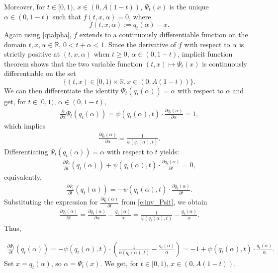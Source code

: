 \documentclass[11pt]{amsart}
\begin{document}
Moreover, for $t \in [0,1)$, $x \in (0, A(1-t))$, $\Psi_t (x)$ is the unique $\alpha \in (0, 1-t)$ such that $f(t,x, \alpha)= 0$, 
where 
$$f(t,x, \alpha) := q_{t}(\alpha) - x.$$
Again using \eqref{qtalpha}, $f$ extends 
to a continuously differentiable function 
on the domain $t, x, \alpha \in \mathbb{R}$, 
$0 < t + \alpha < 1$. Since the derivative of $f$
with respect to $\alpha$ is strictly positive 
at $(t, x, \alpha)$ when $t \geq 0$, 
$\alpha \in (0, 1-t)$, implicit function 
theorem shows that the two variable function 
$(t, x) \mapsto \Psi_t (x)$ is continuously 
differentiable on the set
$$\{(t,x) \in [0,1) \times \mathbb{R}, 
x \in (0, A(1-t))\}.$$
We can then differentiate the identity $\Psi_t(q_t(\alpha)) = \alpha$ with respect to $\alpha$ and get, for $t \in [0, 1)$, $\alpha \in (0, 1-t)$, 
\begin{align*}
    \frac{\partial}{\partial \alpha} \Psi_t(q_t(\alpha)) = \psi(q_t(\alpha), t) \cdot \frac{\partial q_t(\alpha)}{\partial \alpha} = 1, 
\end{align*}
which implies 
\begin{align*}
\frac{\partial q_t(\alpha)}{\partial \alpha} = \frac{1}{\psi(q_t(\alpha), t)}.
\end{align*}
Differentiating $\Psi_t(q_t(\alpha)) = \alpha$ with respect to $t$ yields:
\begin{align*}
\frac{\partial \Psi_t}{\partial t}(q_t(\alpha)) + \psi(q_t(\alpha), t) \cdot \frac{\partial q_t(\alpha)}{\partial t} = 0,
\end{align*}
equivalently,
\begin{align*}
\frac{\partial \Psi_t}{\partial t}(q_t(\alpha)) = -\psi(q_t(\alpha), t) \cdot \frac{\partial q_t(\alpha)}{\partial t}.
\end{align*}
Substituting the expression for $\frac{\partial q_t(\alpha)}{\partial t}$ from \eqref{e:inv_Psit}, we obtain
\begin{align*}
\frac{\partial q_t(\alpha)}{\partial t} 
= \frac{\partial q_t(\alpha)}{\partial \alpha} -\frac{q_t(\alpha)}{\alpha} 
= \frac{1}{\psi(q_t(\alpha), t)} - \frac{q_t(\alpha)}{\alpha}.
\end{align*}
Thus,

\begin{align*}
\frac{\partial \Psi_t}{\partial t}(q_t(\alpha)) 
= -\psi(q_t(\alpha), t) \cdot 
\left( \frac{1}{\psi(q_t(\alpha), t)} - \frac{q_t(\alpha)}{\alpha} \right)
= -1 + \psi(q_t(\alpha), t) \cdot \frac{q_t(\alpha)}{\alpha}.
\end{align*}
Set $x = q_t(\alpha)$, so $\alpha = \Psi_t(x)$. We get, for $t \in [0, 1)$, $x \in (0, A(1-t))$, 
\end{document}
